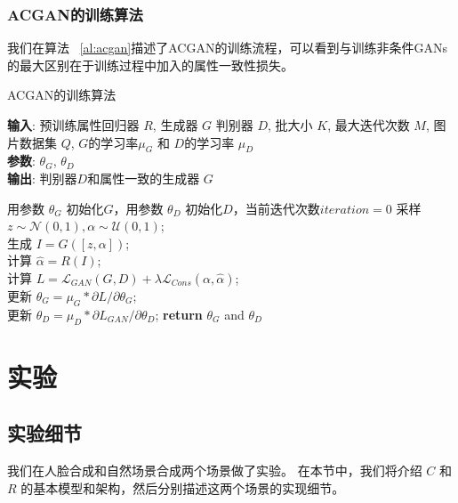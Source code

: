 \subsubsection{ACGAN的训练算法}
我们在算法 ~\ref{al:acgan}描述了ACGAN的训练流程，可以看到与训练非条件GANs的最大区别在于训练过程中加入的属性一致性损失。

\begin{algorithm}[H]
\caption{ACGAN的训练算法}
\label{al:acgan}
\textbf{输入}: 预训练属性回归器 $R$, 生成器 $G$ 判别器 $D$, 批大小 $K$, 最大迭代次数 $M$, 图片数据集 $Q$, $G$的学习率$\mu_G$ 和 $D$的学习率 $\mu_D$\\
\textbf{参数}: $\theta_G$, $\theta_D$\\
\textbf{输出}: 判别器$D$和属性一致的生成器 $G$\\
\begin{algorithmic}[1] %
\STATE 用参数 $\theta_G$ 初始化$G$，用参数 $\theta_D$ 初始化$D$，当前迭代次数$iteration=0$
\STATE 采样 $z \sim \mathcal{N}(0,1), \alpha \sim \mathcal{U}(0,1)$;\\
    \STATE 生成 $I=G([z,\alpha])$;\\
    \STATE 计算 $\hat{\alpha} = R(I)$;\\
    \STATE 计算 $L=\mathcal{L}_{GAN}(G,D) +  \lambda \mathcal{L}_{Cons}(\alpha, \hat{\alpha})$;\\
    \STATE 更新 $\theta_G = \mu_G * \partial{L}/\partial{\theta_G}$;\\
    \STATE 更新 $\theta_D = \mu_D * \partial{L_{GAN}}/\partial{\theta_D}$;
\ENDWHILE
\STATE \textbf{return} $\theta_G$ and $\theta_D$
\end{algorithmic}
\end{algorithm}


\section{实验}

\subsection{实验细节}
我们在人脸合成和自然场景合成两个场景做了实验。 在本节中，我们将介绍 $C$ 和 $R$ 的基本模型和架构，然后分别描述这两个场景的实现细节。

